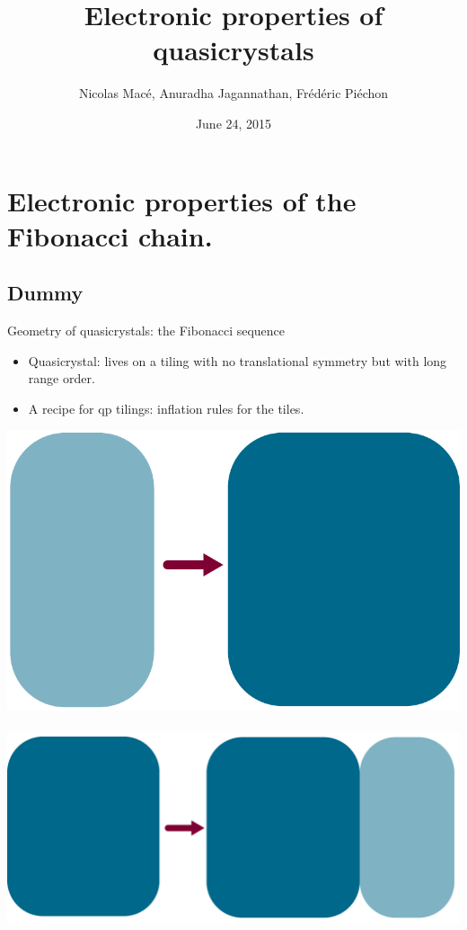 \documentclass[xcolor=x11names,compress,professionalfonts]{beamer}
\renewcommand{\(}{\begin{columns}}
\renewcommand{\)}{\end{columns}}
\newcommand{\<}[1]{\begin{column}{#1}}
\renewcommand{\>}{\end{column}}
\begin{document}
\begin{frame}
\title{Electronic properties of quasicrystals}
\author{ Nicolas Macé, Anuradha Jagannathan, Frédéric Piéchon }
\date{
	June 24, 2015
}
\titlepage
\end{frame}

\section{Electronic properties of the Fibonacci chain.}
\subsection{Dummy}

\begin{frame}{Geometry of quasicrystals: the Fibonacci sequence}

\begin{itemize}
	\item Quasicrystal: lives on a tiling with no translational symmetry but with long range order.
	\item A recipe for qp tilings: inflation rules for the tiles.
\end{itemize}

\newcommand{\s}{.13}
  	\centering
    \includegraphics[scale=\s]{B_A.pdf}~~~~
    \includegraphics[scale=\s]{A_AB.pdf}
    

\end{frame}
\end{document}

